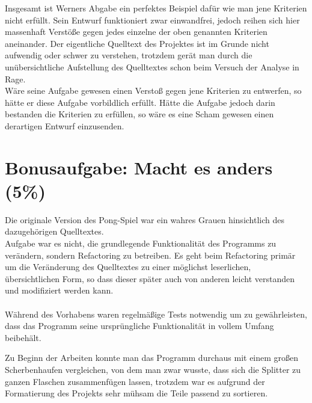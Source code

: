 \documentclass{pi1}
\begin{document}
Insgesamt ist Werners Abgabe ein perfektes Beispiel dafür wie man jene Kriterien nicht erfüllt.
Sein Entwurf funktioniert zwar einwandfrei, jedoch reihen sich hier massenhaft Verstöße gegen jedes einzelne der oben genannten Kriterien aneinander.\newline
Der eigentliche Quelltext des Projektes ist im Grunde nicht aufwendig oder schwer zu verstehen, trotzdem gerät man durch die unübersichtliche Aufstellung des Quelltextes schon beim Versuch der Analyse in Rage.\\
Wäre seine Aufgabe gewesen einen Verstoß gegen jene Kriterien zu entwerfen, so hätte er diese Aufgabe vorbildlich erfüllt.
Hätte die Aufgabe jedoch darin bestanden die Kriterien zu erfüllen, so wäre es eine Scham gewesen einen derartigen Entwurf einzusenden.

\section{Bonusaufgabe: Macht es anders (5\%)}

Die originale Version des Pong-Spiel war ein wahres Grauen hinsichtlich des dazugehörigen Quelltextes.\\
Aufgabe war es nicht, die grundlegende Funktionalität des Programms zu verändern, sondern Refactoring zu betreiben.
Es geht beim Refactoring primär um die Veränderung des Quelltextes zu einer möglichst leserlichen, übersichtlichen Form, so dass dieser später auch von anderen leicht verstanden und modifiziert werden kann.\\
\\
Während des Vorhabens waren regelmäßige Tests notwendig um zu gewährleisten, dass das Programm seine ursprüngliche Funktionalität in vollem Umfang beibehält.\newline

Zu Beginn der Arbeiten konnte man das Programm durchaus mit einem großen Scherbenhaufen vergleichen, von dem man zwar wusste, dass sich die Splitter zu ganzen Flaschen zusammenfügen lassen, trotzdem war es aufgrund der Formatierung des Projekts sehr mühsam die Teile passend zu sortieren.\newline
\end{document}
